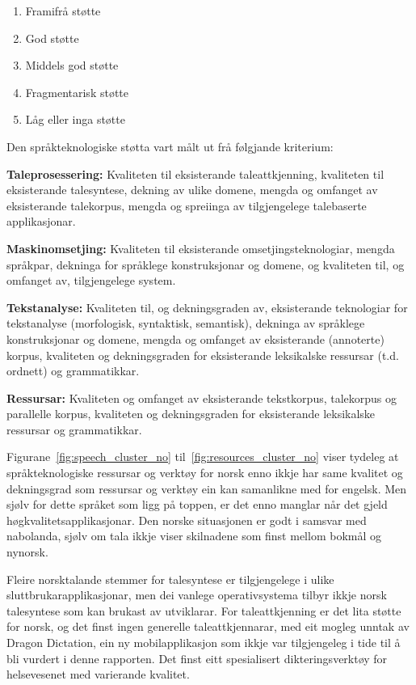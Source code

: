 \begin{multicols}{2}
\begin{enumerate}
\item Framifrå støtte
\item God støtte
\item Middels god støtte 
\item Fragmentarisk støtte
\item Låg eller inga støtte
\end{enumerate}

Den språkteknologiske støtta vart målt ut frå følgjande kriterium:

\textbf{Taleprosessering:} Kvaliteten til eksisterande taleattkjenning, kvaliteten til eksisterande talesyntese, dekning av ulike domene, mengda og omfanget av eksisterande talekorpus, mengda og spreiinga av tilgjengelege talebaserte applikasjonar.

\textbf{Maskinomsetjing:} Kvaliteten til eksisterande omsetjingsteknologiar, mengda språkpar, dekninga for språklege konstruksjonar og domene, og kvaliteten til, og omfanget av, tilgjengelege system.

\textbf{Tekstanalyse:} Kvaliteten til, og dekningsgraden av, eksisterande teknologiar for tekstanalyse (morfologisk, syntaktisk, semantisk), dekninga av språklege konstruksjonar og domene, mengda og omfanget av eksisterande (annoterte) korpus, kvaliteten og dekningsgraden for eksisterande leksikalske ressursar (t.d. ordnett) og grammatikkar.

\textbf{Ressursar:} Kvaliteten og omfanget av eksisterande tekstkorpus, talekorpus og parallelle korpus, kvaliteten og dekningsgraden for eksisterande leksikalske ressursar og grammatikkar.

Figurane~\ref{fig:speech_cluster_no} til~\ref{fig:resources_cluster_no} viser tydeleg at språkteknologiske ressursar og verktøy for norsk enno ikkje har same kvalitet og dekningsgrad som ressursar og verktøy ein kan samanlikne med for engelsk. Men sjølv for dette språket som ligg på toppen, er det enno manglar når det gjeld høgkvalitetsapplikasjonar. 
Den norske situasjonen er godt i samsvar med nabolanda, sjølv om tala ikkje viser skilnadene som finst mellom bokmål og nynorsk.

Fleire norsktalande stemmer for talesyntese er tilgjengelege i ulike sluttbrukarapplikasjonar, men dei vanlege operativsystema tilbyr ikkje norsk talesyntese som kan brukast av utviklarar. 
For taleattkjenning er det lita støtte for norsk, og det finst ingen generelle taleattkjennarar, med eit mogleg unntak av Dragon Dictation, ein ny mobilapplikasjon som ikkje var tilgjengeleg i tide til å bli vurdert i denne rapporten.
Det finst eitt spesialisert dikteringsverktøy for helsevesenet med varierande kvalitet.


\end{multicols}
